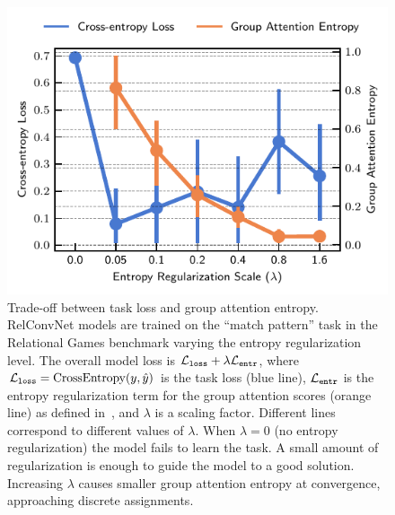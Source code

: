 \begin{figure}[H]
    \centering
    \includegraphics{figs/experiments/group_attn_entropy_tradeoff.pdf}
    \caption{Trade-off between task loss and group attention entropy. RelConvNet models are trained on the ``match pattern'' task in the Relational Games benchmark varying the entropy regularization level. The overall model loss is ${\mathcal{L}}_{\mathtt{loss}} + \lambda {\mathcal{L}}_{\mathtt{entr}}$, where ${\mathcal{L}}_{\mathtt{loss}} = \mathrm{CrossEntropy}(y, \hat{y})$ is the task loss (blue line), ${\mathcal{L}}_{\mathtt{entr}}$ is the entropy regularization term for the group attention scores (orange line) as defined in~, and $\lambda$ is a scaling factor. Different lines correspond to different values of $\lambda$. When $\lambda = 0$ (no entropy regularization) the model fails to learn the task. A small amount of regularization is enough to guide the model to a good solution. Increasing $\lambda$ causes smaller group attention entropy at convergence, approaching discrete assignments.}\label{fig:groupattn_entropy_reg_tradeoff}
\end{figure}

